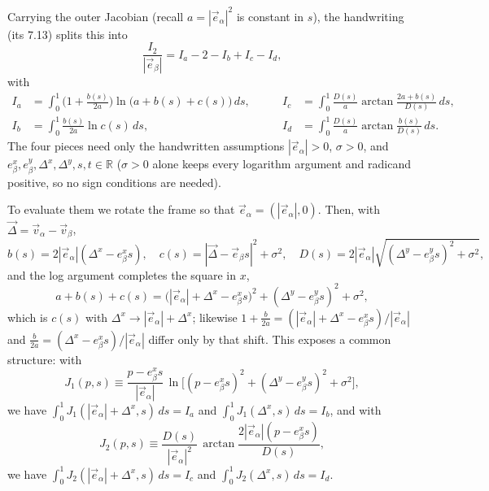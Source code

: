 \documentclass[11pt]{article}
\numberwithin{equation}{section}
\newcommand{\vv}[1]{\vec{#1}}
\begin{document}
Carrying the outer Jacobian (recall $a=|\vv e_\alpha|^2$ is constant in $s$), the handwriting (its 7.13)
splits this into
\begin{equation}\label{eq:I2split}
  \frac{I_2}{|\vv e_\beta|}=I_a-2-I_b+I_c-I_d,
\end{equation}
with
\[
  \begin{aligned}
    I_a&=\int_0^1\!\Big(1+\tfrac{b(s)}{2a}\Big)\ln\big(a+b(s)+c(s)\big)\,ds, &\qquad
    I_c&=\int_0^1\!\tfrac{D(s)}{a}\arctan\tfrac{2a+b(s)}{D(s)}\,ds,\\
    I_b&=\int_0^1\!\tfrac{b(s)}{2a}\ln c(s)\,ds, &\qquad
    I_d&=\int_0^1\!\tfrac{D(s)}{a}\arctan\tfrac{b(s)}{D(s)}\,ds.
  \end{aligned}
\]
The four pieces need only the handwritten assumptions $|\vv e_\alpha|>0$, $\sigma>0$, and
$e_\beta^x,e_\beta^y,\Delta^x,\Delta^y,s,t\in\mathbb R$ ($\sigma>0$ alone keeps every logarithm argument
and radicand positive, so no sign conditions are needed).

To evaluate them we rotate the frame so that $\vv e_\alpha=(|\vv e_\alpha|,0)$. Then, with $\vv\Delta=\vv
v_\alpha-\vv v_\beta$,
\begin{equation}\label{eq:rotframe}
  b(s)=2|\vv e_\alpha|(\Delta^x-e_\beta^x s),\quad
  c(s)=|\vv\Delta-\vv e_\beta s|^2+\sigma^2,\quad
  D(s)=2|\vv e_\alpha|\sqrt{(\Delta^y-e_\beta^y s)^2+\sigma^2},
\end{equation}
and the log argument completes the square in $x$,
\[
  a+b(s)+c(s)=\big(|\vv e_\alpha|+\Delta^x-e_\beta^x s\big)^2+(\Delta^y-e_\beta^y s)^2+\sigma^2 ,
\]
which is $c(s)$ with $\Delta^x\!\to\!|\vv e_\alpha|+\Delta^x$; likewise $1+\tfrac{b}{2a}
=(|\vv e_\alpha|+\Delta^x-e_\beta^x s)/|\vv e_\alpha|$ and $\tfrac{b}{2a}=(\Delta^x-e_\beta^x s)/|\vv
e_\alpha|$ differ only by that shift. This exposes a common structure: with
\begin{equation}\label{eq:J1def}
  J_1(p,s)\equiv\frac{p-e_\beta^x s}{|\vv e_\alpha|}\,
  \ln\!\big[(p-e_\beta^x s)^2+(\Delta^y-e_\beta^y s)^2+\sigma^2\big],
\end{equation}
we have $\int_0^1 J_1(|\vv e_\alpha|+\Delta^x,s)\,ds=I_a$ and $\int_0^1 J_1(\Delta^x,s)\,ds=I_b$, and with
\begin{equation}\label{eq:J2def}
  J_2(p,s)\equiv\frac{D(s)}{|\vv e_\alpha|^2}\,\arctan\!\frac{2|\vv e_\alpha|(p-e_\beta^x s)}{D(s)},
\end{equation}
we have $\int_0^1 J_2(|\vv e_\alpha|+\Delta^x,s)\,ds=I_c$ and $\int_0^1 J_2(\Delta^x,s)\,ds=I_d$.
\end{document}
